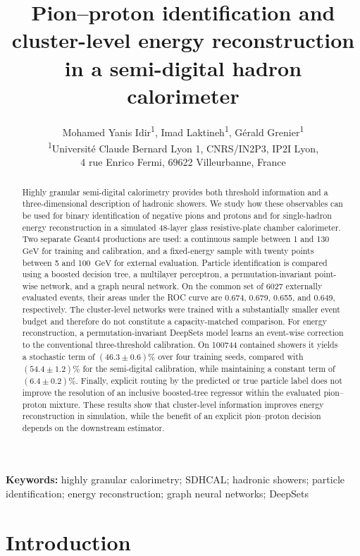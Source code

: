 \documentclass[11pt,a4paper]{article}
\title{\bfseries Pion--proton identification and cluster-level energy reconstruction\\
in a semi-digital hadron calorimeter}
\author{
  Mohamed Yanis Idir\textsuperscript{1},
  Imad Laktineh\textsuperscript{1},
  Gérald Grenier\textsuperscript{1}\\[0.6em]
  \small\textsuperscript{1}Université Claude Bernard Lyon 1, CNRS/IN2P3, IP2I Lyon,\\[-0.15em]
  \small 4 rue Enrico Fermi, 69622 Villeurbanne, France
}
\date{}
\newcommand{\GeV}{\ensuremath{\mathrm{GeV}}}
\begin{document}
\maketitle
\vspace{-2.0em}

\begin{abstract}
Highly granular semi-digital calorimetry provides both threshold information and a
three-dimensional description of hadronic showers. We study how these observables
can be used for binary identification of negative pions and protons and for
single-hadron energy reconstruction in a simulated 48-layer glass resistive-plate
chamber calorimeter. Two separate Geant4 productions are used: a continuous
sample between 1 and 130~\GeV{} for training and calibration, and a fixed-energy
sample with twenty points between 5 and 100~\GeV{} for external evaluation.
Particle identification is compared using a boosted decision tree, a multilayer
perceptron, a permutation-invariant point-wise network, and a graph neural network.
On the common set of 6027 externally evaluated events, their areas under the ROC
curve are 0.674, 0.679, 0.655, and 0.649, respectively. The cluster-level networks were
trained with a substantially smaller event budget and therefore do not constitute
a capacity-matched comparison. For energy reconstruction, a permutation-invariant
DeepSets model learns an event-wise correction to the conventional three-threshold
calibration. On 100744 contained showers it yields a stochastic term of
$(46.3\pm0.6)\%$ over four training seeds, compared with $(54.4\pm1.2)\%$ for the
semi-digital calibration,
while maintaining a constant term of $(6.4\pm0.2)\%$. Finally, explicit routing by
the predicted or true particle label does not improve the resolution of an inclusive
boosted-tree regressor within the evaluated pion--proton mixture. These results show
that cluster-level information improves energy reconstruction in simulation, while
the benefit of an explicit pion--proton decision depends on the downstream estimator.
\end{abstract}

\noindent\textbf{Keywords:} highly granular calorimetry; SDHCAL; hadronic showers;
particle identification; energy reconstruction; graph neural networks; DeepSets

\tableofcontents

\section{Introduction}
\label{sec:introduction}
\end{document}
